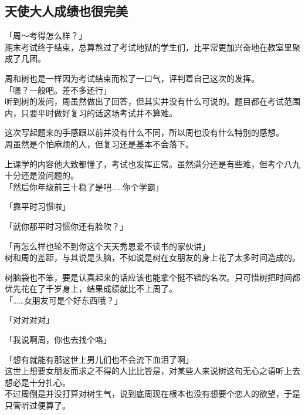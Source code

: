 \subsection{天使大人成绩也很完美}

「周～考得怎么样？」\\

期末考试终于结束，总算熬过了考试地狱的学生们，比平常更加兴奋地在教室里聚成了几团。

周和树也是一样因为考试结束而松了一口气，评判着自己这次的发挥。\\

「嗯？一般吧。差不多还行」\\

听到树的发问，周虽然做出了回答，但其实并没有什么可说的。题目都在考试范围内，只要平时做好复习的话这场考试并不算难。

这次写起题来的手感跟以前并没有什么不同，所以周也没有什么特别的感想。\\

周虽然是个怕麻烦的人，但复习还是基本不会落下。

上课学的内容他大致都懂了，考试也发挥正常。虽然满分还是有些难，但考个八九十分还是没问题的。\\

「然后你年级前三十稳了是吧……你个学霸」

「靠平时习惯啦」

「就你那平时习惯你还有脸吹？」

「再怎么样也轮不到你这个天天秀恩爱不读书的家伙讲」\\

树和周的差距，与其说是头脑，不如说是树在女朋友的身上花了太多时间造成的。

树脑袋也不笨，要是认真起来的话应该也能拿个挺不错的名次。只可惜树把时间都优先花在了千岁身上，结果成绩就比不上周了。\\

「……女朋友可是个好东西哦？」

「对对对对」

「我说啊周，你也去找个咯」

「想有就能有那这世上男儿们也不会流下血泪了啊」\\

这世上想要女朋友而求之不得的人比比皆是，对某些人来说树这句无心之语听上去想必是十分扎心。\\

不过周倒是并没打算对树生气，说到底周现在根本也没有想要个恋人的欲望，于是只管听过便算了。\\

